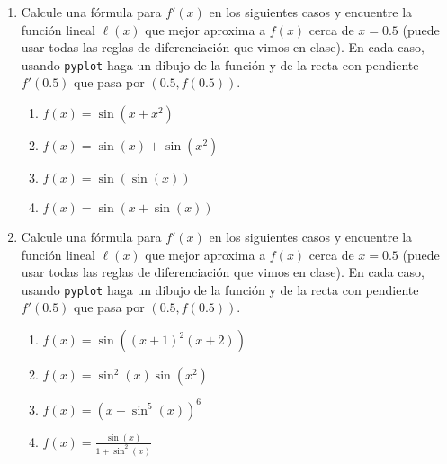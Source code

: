 \documentclass[12pt, a4paper]{article}
\begin{document}
\begin{enumerate}
\item Calcule una fórmula para $f'(x)$ en los siguientes casos y encuentre la función lineal $\ell(x)$ que mejor aproxima a $f(x)$ cerca de $x=0.5$ (puede usar todas las reglas de diferenciación que vimos en clase). En cada caso, usando \verb!pyplot! haga un dibujo de la funci\'on y de la recta con pendiente $f'(0.5)$ que pasa por $(0.5,f(0.5))$.
\begin{enumerate}
\item $f(x)=\sin(x+x^2)$
\item $f(x)=\sin(x)+\sin(x^2)$
\item $f(x)=\sin(\sin(x))$
\item $f(x)=\sin(x+\sin(x))$
\end{enumerate}


\item Calcule una fórmula para $f'(x)$ en los siguientes casos y encuentre la función lineal $\ell(x)$ que mejor aproxima a $f(x)$ cerca de $x=0.5$ (puede usar todas las reglas de diferenciación que vimos en clase). En cada caso, usando \verb!pyplot! haga un dibujo de la funci\'on y de la recta con pendiente $f'(0.5)$ que pasa por $(0.5,f(0.5))$.
\begin{enumerate}
\item $f(x)=\sin((x+1)^2(x+2))$
\item $f(x)=\sin^2(x)\sin(x^2)$
\item $f(x)=(x+\sin^5(x))^6$
\item $f(x)=\frac{\sin(x)}{1+\sin^2(x)}$
\end{enumerate}
\end{enumerate}
\end{document}
